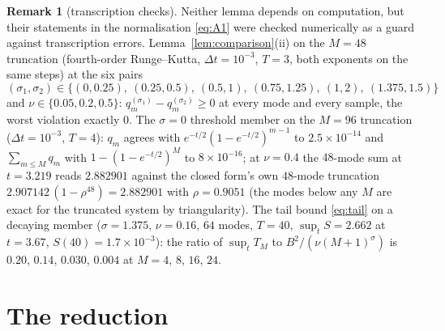 \documentclass[11pt,a4paper]{article}
\theoremstyle{plain}
\theoremstyle{definition}
\newtheorem{remark}[theorem]{Remark}
\begin{document}
\begin{remark}[transcription checks]
Neither lemma depends on computation, but their statements in the normalisation \eqref{eq:A1} were checked numerically as a guard against transcription errors. Lemma~\ref{lem:comparison}(ii) on the $M=48$ truncation (fourth-order Runge--Kutta, $\Delta t=10^{-3}$, $T=3$, both exponents on the same steps) at the six pairs
\[
(\sigma_1,\sigma_2)\in\{(0,0.25),\ (0.25,0.5),\ (0.5,1),\ (0.75,1.25),\ (1,2),\ (1.375,1.5)\}
\]
and $\nu\in\{0.05,0.2,0.5\}$: $q_m^{(\sigma_1)}-q_m^{(\sigma_2)}\ge0$ at every mode and every sample, the worst violation exactly $0$. The $\sigma=0$ threshold member on the $M=96$ truncation ($\Delta t=10^{-3}$, $T=4$): $q_m$ agrees with $e^{-t/2}(1-e^{-t/2})^{m-1}$ to $2.5\times10^{-14}$ and $\sum_{m\le M}q_m$ with $1-(1-e^{-t/2})^M$ to $8\times10^{-16}$; at $\nu=0.4$ the $48$-mode sum at $t=3.219$ reads $2.882901$ against the closed form's own $48$-mode truncation $2.907142\,(1-\rho^{48})=2.882901$ with $\rho=0.9051$ (the modes below any $M$ are exact for the truncated system by triangularity). The tail bound \eqref{eq:tail} on a decaying member ($\sigma=1.375$, $\nu=0.16$, $64$ modes, $T=40$, $\sup_tS=2.662$ at $t=3.67$, $S(40)=1.7\times10^{-3}$): the ratio of $\sup_tT_M$ to $B^2/(\nu(M+1)^\sigma)$ is $0.20$, $0.14$, $0.030$, $0.004$ at $M=4$, $8$, $16$, $24$.
\end{remark}

\section{The reduction}\label{app:B}
\end{document}

